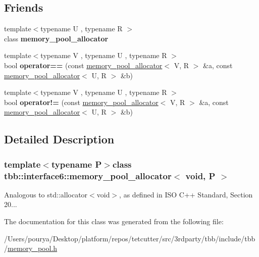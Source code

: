\subsection*{Friends}
\begin{DoxyCompactItemize}
\item 
\hypertarget{classtbb_1_1interface6_1_1memory__pool__allocator_3_01void_00_01P_01_4_a6c34ee2e5a57845f050b507cc516a005}{}{\footnotesize template$<$typename U , typename R $>$ }\\class {\bfseries memory\+\_\+pool\+\_\+allocator}\label{classtbb_1_1interface6_1_1memory__pool__allocator_3_01void_00_01P_01_4_a6c34ee2e5a57845f050b507cc516a005}

\item 
\hypertarget{classtbb_1_1interface6_1_1memory__pool__allocator_3_01void_00_01P_01_4_ac8c26a64f4e012f2a9cf6035cf029905}{}{\footnotesize template$<$typename V , typename U , typename R $>$ }\\bool {\bfseries operator==} (const \hyperlink{classtbb_1_1interface6_1_1memory__pool__allocator}{memory\+\_\+pool\+\_\+allocator}$<$ V, R $>$ \&a, const \hyperlink{classtbb_1_1interface6_1_1memory__pool__allocator}{memory\+\_\+pool\+\_\+allocator}$<$ U, R $>$ \&b)\label{classtbb_1_1interface6_1_1memory__pool__allocator_3_01void_00_01P_01_4_ac8c26a64f4e012f2a9cf6035cf029905}

\item 
\hypertarget{classtbb_1_1interface6_1_1memory__pool__allocator_3_01void_00_01P_01_4_a2f7230e5bc817e7512e18b5311b3371b}{}{\footnotesize template$<$typename V , typename U , typename R $>$ }\\bool {\bfseries operator!=} (const \hyperlink{classtbb_1_1interface6_1_1memory__pool__allocator}{memory\+\_\+pool\+\_\+allocator}$<$ V, R $>$ \&a, const \hyperlink{classtbb_1_1interface6_1_1memory__pool__allocator}{memory\+\_\+pool\+\_\+allocator}$<$ U, R $>$ \&b)\label{classtbb_1_1interface6_1_1memory__pool__allocator_3_01void_00_01P_01_4_a2f7230e5bc817e7512e18b5311b3371b}

\end{DoxyCompactItemize}


\subsection{Detailed Description}
\subsubsection*{template$<$typename P$>$class tbb\+::interface6\+::memory\+\_\+pool\+\_\+allocator$<$ void, P $>$}

Analogous to std\+::allocator$<$void$>$, as defined in I\+S\+O C++ Standard, Section 20... 



The documentation for this class was generated from the following file\+:\begin{DoxyCompactItemize}
\item 
/\+Users/pourya/\+Desktop/platform/repos/tetcutter/src/3rdparty/tbb/include/tbb/\hyperlink{memory__pool_8h}{memory\+\_\+pool.\+h}\end{DoxyCompactItemize}
